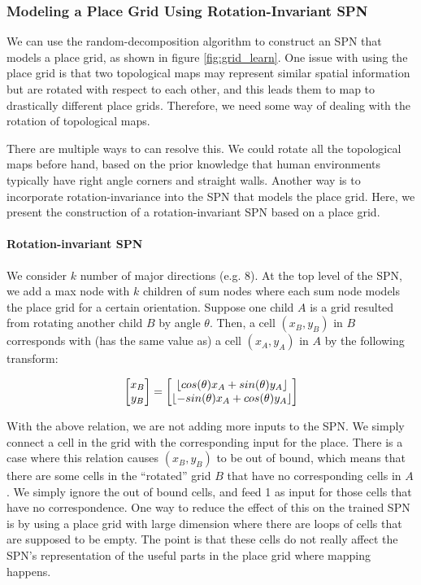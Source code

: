 \documentclass[10pt, titlepage]{article}
\theoremstyle{definition}
\DeclarePairedDelimiter\floor{\lfloor}{\rfloor}
\begin{document}
\subsubsection{Modeling a Place Grid Using Rotation-Invariant SPN}

We can use the random-decomposition algorithm to construct an SPN that models a place grid, as shown in figure \ref{fig:grid_learn}. One issue with using the place grid is that two topological maps may represent similar spatial information but are rotated with respect to each other, and this leads them to map to drastically different place grids. Therefore, we need some way of dealing with the rotation of topological maps.

There are multiple ways to can resolve this. We could rotate all the topological maps before hand, based on the prior knowledge that human environments typically have right angle corners and straight walls. Another way is to incorporate rotation-invariance into the SPN that models the place grid. Here, we present the construction of a rotation-invariant SPN based on a place grid.

\paragraph{Rotation-invariant SPN} We consider $k$ number of major directions (e.g. 8). At the top level of the SPN, we add a max node with $k$ children of sum nodes where each sum node models the place grid for a certain orientation. Suppose one child $A$ is a grid resulted from rotating another child $B$ by angle $\theta$. Then, a cell $(x_B, y_B)$ in $B$ corresponds with (has the same value as) a cell $(x_A, y_A)$ in $A$ by the following transform:

\begin{equation}
\begin{bmatrix}
x_B \\
y_B \\
\end{bmatrix}
=
\begin{bmatrix}
\floor{cos(\theta)x_A+sin(\theta)y_A}\\
\floor{-sin(\theta)x_A+cos(\theta)y_A}\\
\end{bmatrix}
\end{equation}

With the above relation, we are not adding more inputs to the SPN. We simply connect a cell in the grid with the corresponding input for the place. There is a case where this relation causes $(x_B, y_B)$ to be out of bound, which means that there are some cells in the ``rotated'' grid $B$ that have no corresponding cells in $A$. We simply ignore the out of bound cells, and feed 1 as input for those cells that have no correspondence. One way to reduce the effect of this on the trained SPN is by using a place grid with large dimension where there are loops of cells that are supposed to be empty. The point is that these cells do not really affect the SPN's representation of the useful parts in the place grid where mapping happens.
\end{document}
